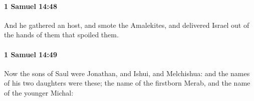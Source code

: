 		\paragraph{1 Samuel 14:48} %
			\label{1SAMUEL-14-48}

			And he gathered an host, and smote the Amalekites, and delivered Israel out of the hands of them that spoiled them.


		\paragraph{1 Samuel 14:49} %
			\label{1SAMUEL-14-49}

			Now the sons of Saul were Jonathan, and Ishui, and Melchishua: and the names of his two daughters were these; the name of the firstborn Merab, and the name of the younger Michal:


